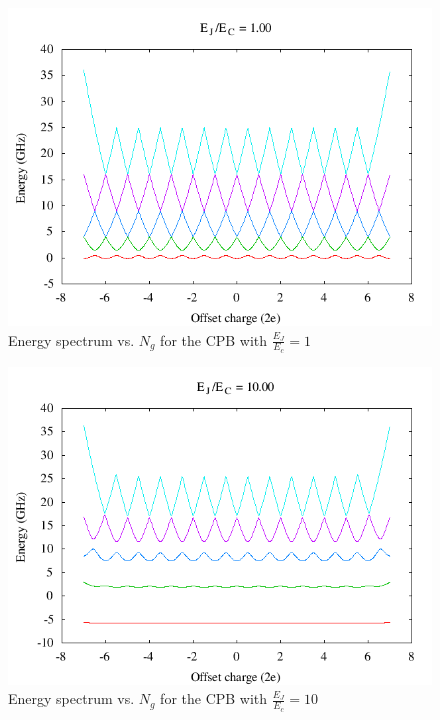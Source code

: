 \documentclass[twocolumn]{revtex4}
\begin{document}
\begin{figure}
  \includegraphics[width=\linewidth]{CPB-1.png}
  \caption{Energy spectrum vs. $N_g$ for the CPB with
    $\frac{E_J}{E_c}=1$}
  \label{cpb-1}
\end{figure}
\begin{figure}
  \includegraphics[width=\linewidth]{CPB-10.png}
  \caption{Energy spectrum vs. $N_g$ for the CPB with
    $\frac{E_J}{E_c}=10$}
  \label{cpb-10}
\end{figure}
\end{document}
